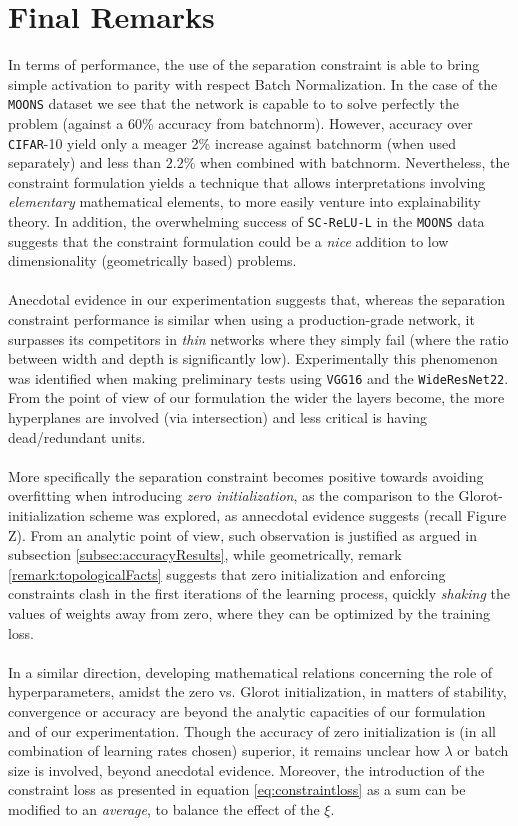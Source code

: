 \section{Final Remarks}\label{sec:finalRemarks}

In terms of performance, the use of the separation constraint is able to bring simple \ReLU activation to parity with respect Batch Normalization. In the case of the \texttt{MOONS} dataset we see that the network is capable to to solve perfectly the problem (against a 60\% accuracy from batchnorm). However, accuracy over \texttt{CIFAR}-10 yield only a meager 2\% increase against batchnorm (when used separately) and less than $2.2$\% when combined with batchnorm. Nevertheless, the constraint formulation yields a technique that allows interpretations involving \emph{elementary} mathematical elements, to more easily venture into explainability theory. In addition, the overwhelming success of \texttt{SC-ReLU-L} in the \texttt{MOONS} data suggests that the constraint formulation could be a \emph{nice} addition to low dimensionality (geometrically based) problems. 
\\\\
Anecdotal evidence in our experimentation suggests that, whereas the separation constraint performance is similar when using a production-grade network, it surpasses its competitors in \emph{thin} networks where they simply fail (where the ratio between width and depth is significantly low). Experimentally this phenomenon was identified when making preliminary tests using \texttt{VGG16} and the \texttt{WideResNet22}. From the point of view of our formulation the wider the layers become, the more hyperplanes are involved (via intersection) and less critical is having dead/redundant units.
\\\\
More specifically the separation constraint becomes positive towards avoiding overfitting when introducing  \emph{zero initialization}, as the comparison to the Glorot-initialization scheme was explored, as annecdotal evidence suggests (recall Figure Z). From an analytic point of view, such observation is justified as argued in subsection \ref{subsec:accuracyResults}, while geometrically, remark \ref{remark:topologicalFacts} suggests that zero initialization and enforcing constraints clash in the first iterations of the learning process, quickly \emph{shaking} the values of  weights away from zero, where they can be optimized by the training loss.
\\\\
In a similar direction, developing mathematical relations concerning the role of hyperparameters, amidst the zero vs. Glorot initialization, in matters of stability, convergence or accuracy are beyond the analytic capacities of our formulation and of our experimentation. Though the accuracy of zero initialization is (in all combination of learning rates chosen) superior, it remains unclear how $\lambda$ or batch size is involved, beyond anecdotal evidence. Moreover, the introduction of the constraint loss as presented in equation \ref{eq:constraintloss} as a sum can be modified to an \emph{average}, to balance the effect of the $\xi$.      

  